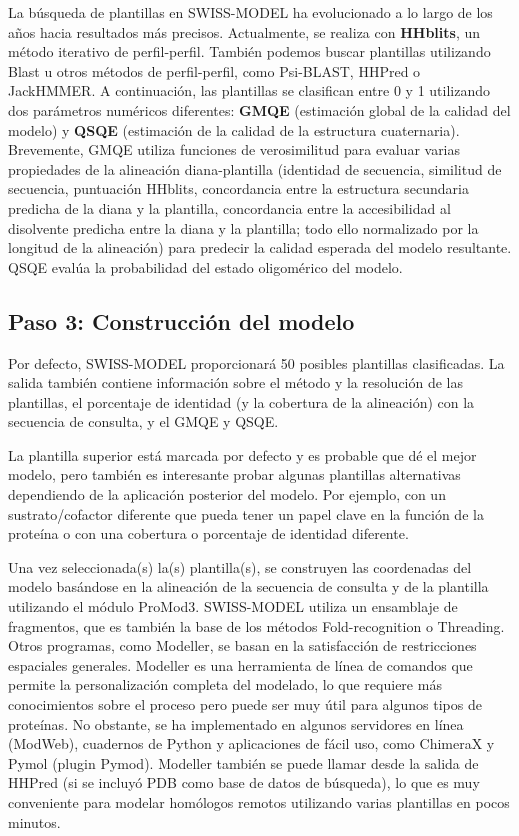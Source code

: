 La búsqueda de plantillas en SWISS-MODEL ha evolucionado a lo largo de los años hacia resultados más precisos. Actualmente, se realiza con \textbf{HHblits}, un método iterativo de perfil-perfil. También podemos buscar plantillas utilizando Blast u otros métodos de perfil-perfil, como Psi-BLAST, HHPred o JackHMMER. A continuación, las plantillas se clasifican entre 0 y 1 utilizando dos parámetros numéricos diferentes: \textbf{GMQE} (estimación global de la calidad del modelo) y \textbf{QSQE} (estimación de la calidad de la estructura cuaternaria). Brevemente, GMQE utiliza funciones de verosimilitud para evaluar varias propiedades de la alineación diana-plantilla (identidad de secuencia, similitud de secuencia, puntuación HHblits, concordancia entre la estructura secundaria predicha de la diana y la plantilla, concordancia entre la accesibilidad al disolvente predicha entre la diana y la plantilla; todo ello normalizado por la longitud de la alineación) para predecir la calidad esperada del modelo resultante. QSQE evalúa la probabilidad del estado oligomérico del modelo.

\subsection{Paso 3: Construcción del modelo}
Por defecto, SWISS-MODEL proporcionará 50 posibles plantillas clasificadas. La salida también contiene información sobre el método y la resolución de las plantillas, el porcentaje de identidad (y la cobertura de la alineación) con la secuencia de consulta, y el GMQE y QSQE.

La plantilla superior está marcada por defecto y es probable que dé el mejor modelo, pero también es interesante probar algunas plantillas alternativas dependiendo de la aplicación posterior del modelo. Por ejemplo, con un sustrato/cofactor diferente que pueda tener un papel clave en la función de la proteína o con una cobertura o porcentaje de identidad diferente.

Una vez seleccionada(s) la(s) plantilla(s), se construyen las coordenadas del modelo basándose en la alineación de la secuencia de consulta y de la plantilla utilizando el módulo ProMod3. SWISS-MODEL utiliza un ensamblaje de fragmentos, que es también la base de los métodos Fold-recognition o Threading. Otros programas, como Modeller, se basan en la satisfacción de restricciones espaciales generales. Modeller es una herramienta de línea de comandos que permite la personalización completa del modelado, lo que requiere más conocimientos sobre el proceso pero puede ser muy útil para algunos tipos de proteínas. No obstante, se ha implementado en algunos servidores en línea (ModWeb), cuadernos de Python y aplicaciones de fácil uso, como ChimeraX y Pymol (plugin Pymod). Modeller también se puede llamar desde la salida de HHPred (si se incluyó PDB como base de datos de búsqueda), lo que es muy conveniente para modelar homólogos remotos utilizando varias plantillas en pocos minutos.

